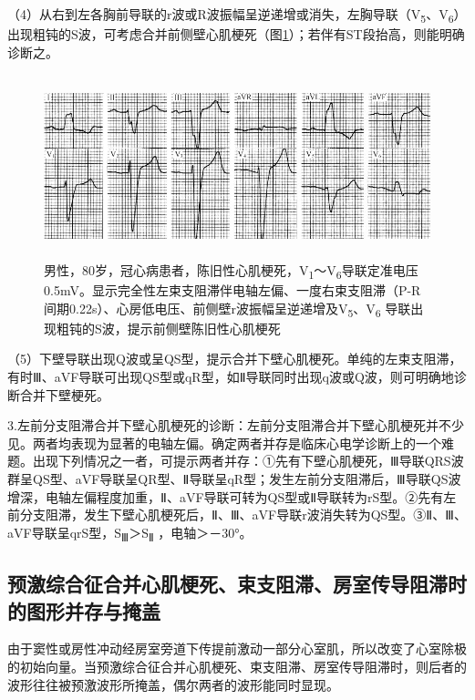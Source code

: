 （4）从右到左各胸前导联的r波或R波振幅呈逆递增或消失，左胸导联（V\textsubscript{5}、V\textsubscript{6}）出现粗钝的S波，可考虑合并前侧壁心肌梗死（图\ref{fig36-15}）；若伴有ST段抬高，则能明确诊断之。

\begin{figure}[!htbp]
 \centering
 \includegraphics[width=5.58333in,height=2.09375in]{./images/Image00587.jpg}
 \captionsetup{justification=centering}
 \caption{男性，80岁，冠心病患者，陈旧性心肌梗死，V\textsubscript{1}～V\textsubscript{6}导联定准电压0.5mV。显示完全性左束支阻滞伴电轴左偏、一度右束支阻滞（P-R间期0.22s）、心房低电压、前侧壁r波振幅呈逆递增及V\textsubscript{5}、V\textsubscript{6} 导联出现粗钝的S波，提示前侧壁陈旧性心肌梗死}
 \label{fig36-15}
  \end{figure} 


（5）下壁导联出现Q波或呈QS型，提示合并下壁心肌梗死。单纯的左束支阻滞，有时Ⅲ、aVF导联可出现QS型或qR型，如Ⅱ导联同时出现q波或Q波，则可明确地诊断合并下壁梗死。

3.左前分支阻滞合并下壁心肌梗死的诊断：左前分支阻滞合并下壁心肌梗死并不少见。两者均表现为显著的电轴左偏。确定两者并存是临床心电学诊断上的一个难题。出现下列情况之一者，可提示两者并存：①先有下壁心肌梗死，Ⅲ导联QRS波群呈QS型、aVF导联呈QR型、Ⅱ导联呈qR型；发生左前分支阻滞后，Ⅲ导联QS波增深，电轴左偏程度加重，Ⅱ、aVF导联可转为QS型或Ⅱ导联转为rS型。②先有左前分支阻滞，发生下壁心肌梗死后，Ⅱ、Ⅲ、aVF导联r波消失转为QS型。③Ⅱ、Ⅲ、aVF导联呈qrS型，S\textsubscript{Ⅲ}＞S\textsubscript{Ⅱ} ，电轴＞－30°。

\protect\hypertarget{text00043.htmlux5cux23subid479}{}{}

\subsection{预激综合征合并心肌梗死、束支阻滞、房室传导阻滞时的图形并存与掩盖}

由于窦性或房性冲动经房室旁道下传提前激动一部分心室肌，所以改变了心室除极的初始向量。当预激综合征合并心肌梗死、束支阻滞、房室传导阻滞时，则后者的波形往往被预激波形所掩盖，偶尔两者的波形能同时显现。

